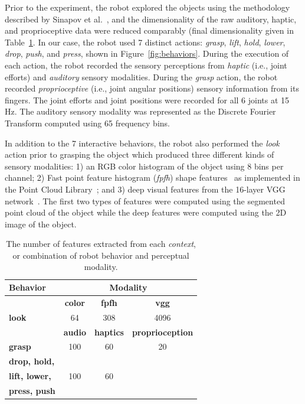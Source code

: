 Prior to the experiment, the robot explored the objects using the methodology described by Sinapov et al.~, and the dimensionality of the raw auditory, haptic, and proprioceptive data were reduced comparably (final dimensionality given in Table~\ref{tab:feature_space_of_contexts}.
In our case, the robot used 7 distinct actions: {\it grasp}, {\it lift}, {\it hold}, {\it lower}, {\it drop}, {\it push}, and {\it press}, shown in Figure~\ref{fig:behaviors}.
During the execution of each action, the robot recorded the sensory perceptions from {\it haptic} (i.e., joint efforts) and {\it auditory} sensory modalities.
During the {\it grasp} action, the robot recorded {\it proprioceptive} (i.e., joint angular positions) sensory information from its fingers.
The joint efforts and joint positions were recorded for all 6 joints at 15 Hz.
The auditory sensory modality was represented as the Discrete Fourier Transform computed using 65 frequency bins.

In addition to the 7 interactive behaviors, the robot also performed the {\it look} action prior to grasping the object which produced three different kinds of sensory modalities: 1) an RGB color histogram of the object using 8 bins per channel; 2) Fast point feature histogram ({\it fpfh}) shape features~\cite{rusu:icra09} as implemented in the Point Cloud Library~\cite{aldoma:ram12}; and 3) deep visual features from the 16-layer VGG network~\cite{simonyan:corr14}.
The first two types of features were computed using the segmented point cloud of the object while the deep features were computed using the 2D image of the object. 

\begin{table}
\centering
\begin{tabular}[h]{|l|c|c|c|}
	\hline
	\bf Behavior & \multicolumn{3}{c|}{\bf Modality} \\ \hline \hline
	& \bf color & \bf fpfh & \bf vgg \\ \hline
	\bf look & 64 & 308 & 4096 \\ \hline \hline
	& \bf audio & \bf haptics & \bf proprioception \\ \hline
	\bf grasp & 100 & 60 & 20 \\ \hline
	\bf drop, hold, & & & \\
	\bf lift, lower, & 100 & 60 & \\
	\bf press, push & & & \\ \hline
\end{tabular}
\caption{The number of features extracted from each \textit{context}, or combination of robot behavior and perceptual modality.}
\label{tab:feature_space_of_contexts}
\end{table}

